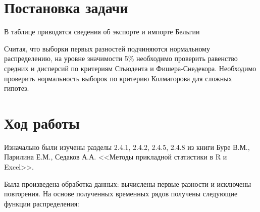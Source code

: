 \section{Постановка задачи}

В таблице приводятся сведения об экспорте и импорте Бельгии


Считая, что выборки первых разностей подчиняются нормальному распределению, на уровне значимости 5\% необходимо проверить равенство средних и дисперсий по критериям Стьюдента и Фишера-Снедекора. Необходимо проверить нормальность выборок по критерию Колмагорова для сложных гипотез.

\section{Ход работы}

Изначально были изучены разделы 2.4.1, 2.4.2, 2.4.5, 2.4.8 из книги Буре В.М., Парилина Е.М., Седаков А.А. <<Методы прикладной статистики в R и Excel>>.

Была произведена обработка данных: вычислены первые разности и исключены повторения. На основе полученных временных рядов получены следующие функции распределения:

